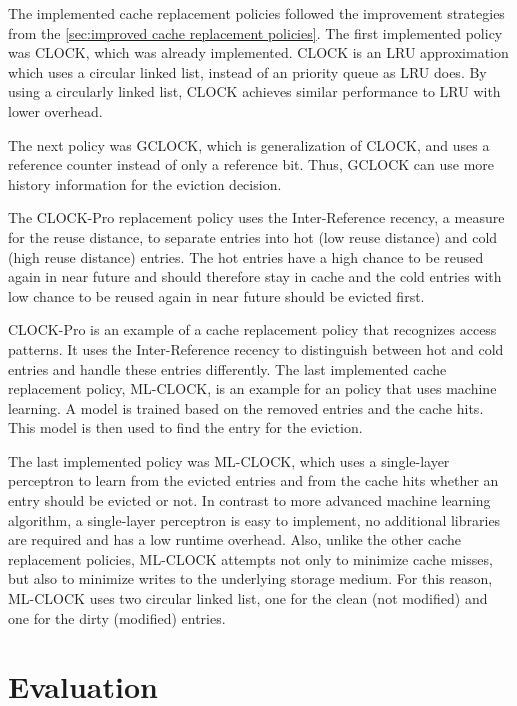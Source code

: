 \documentclass[
	12pt,
	a4paper,
	abstract,
	bibliography=totoc,
	chapterprefix,
	headings=openright,
	numbers=endperiod,
	parskip=half,
	twoside,
]{scrreprt}
\begin{document}
The implemented cache replacement policies followed the improvement strategies from the \cref{sec:improved cache replacement policies}.
The first implemented policy was CLOCK, which was already implemented.
CLOCK is an LRU approximation which uses a circular linked list, instead of an priority queue as LRU does.
By using a circularly linked list, CLOCK achieves similar performance to LRU with lower overhead.

The next policy was GCLOCK, which is generalization of CLOCK, and uses a reference counter instead of only a reference bit.
Thus, GCLOCK can use more history information for the eviction decision.

The CLOCK-Pro replacement policy uses the Inter-Reference recency, a measure for the reuse distance, to separate entries into
hot (low reuse distance) and cold (high reuse distance) entries.
The hot entries have a high chance to be reused again in near future and should therefore stay in cache and
the cold entries with low chance to be reused again in near future should be evicted first.

CLOCK-Pro is an example of a cache replacement policy that recognizes access patterns.
It uses the Inter-Reference recency to distinguish between hot and cold entries and handle these entries differently.
The last implemented cache replacement policy, ML-CLOCK, is an example for an policy that uses machine learning.
A model is trained based on the removed entries and the cache hits. 
This model is then used to find the entry for the eviction.

The last implemented policy was ML-CLOCK, which uses a single-layer perceptron to learn from the evicted entries and 
from the cache hits whether an entry should be evicted or not.
In contrast to more advanced machine learning algorithm, a single-layer perceptron is easy to implement, no additional libraries are required 
and has a low runtime overhead.
Also, unlike the other cache replacement policies, ML-CLOCK attempts not only to minimize cache misses,
but also to minimize writes to the underlying storage medium.
For this reason, ML-CLOCK uses two circular linked list, one for the clean (not modified) 
and one for the dirty (modified) entries.

\chapter{Evaluation}
\label{cha:evaluation}

\end{document}
